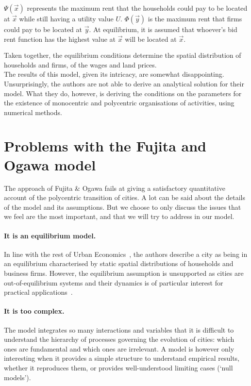 $\Psi(\vec{x})$ represents the maximum rent that the households could pay to be
located at $\vec{x}$ while still having a utility value $U$. $\Phi(\vec{y})$ is
the maximum rent that firms could pay to be located at $\vec{y}$. At
equilibrium, it is assumed that whoever's bid rent function has the highest
value at $\vec{x}$ will be located at $\vec{x}$.

Taken together, the equilibrium conditions determine the spatial distribution of
households and firms, of the wages and land prices.\\

The results of this model, given its intricacy, are somewhat disappointing.
Unsurprisingly, the authors are not able to derive an analytical solution for
their model. What they do, however, is deriving the conditions on the parameters
for the existence of monocentric and polycentric organisations of activities,
using numerical methods.

\section{Problems with the Fujita and Ogawa model}
\label{sec:problems_with_the_fujita_and_ogawa_model}

The approach of Fujita \& Ogawa fails at giving a satisfactory quantitative account  of the
polycentric transition of cities. A lot can be said about the details of the
model and its assumptions. But we choose to only discuss the issues that we
feel are the most important, and that we will try to address in our model. 

\paragraph{It is an equilibrium model.} In line with the rest of Urban
Economics~\cite{Fujita:2001, Fujita:2013}, the authors describe a city as being in
an equilibrium characterised by static spatial distributions of households and
business firms. However, the equilibrium assumption is unsupported as cities are
out-of-equilibrium systems and their dynamics is of particular interest for
practical applications~\cite{Batty:2008}.

\paragraph{It is too complex.} The model integrates so many interactions and
variables that it is difficult to understand the hierarchy of processes
governing the evolution of cities: which ones are fundamental and which ones are
irrelevant. A model is however only interesting when it provides a simple
structure to understand empirical results, whether it reproduces them, or
provides well-understood limiting cases (`null models').

